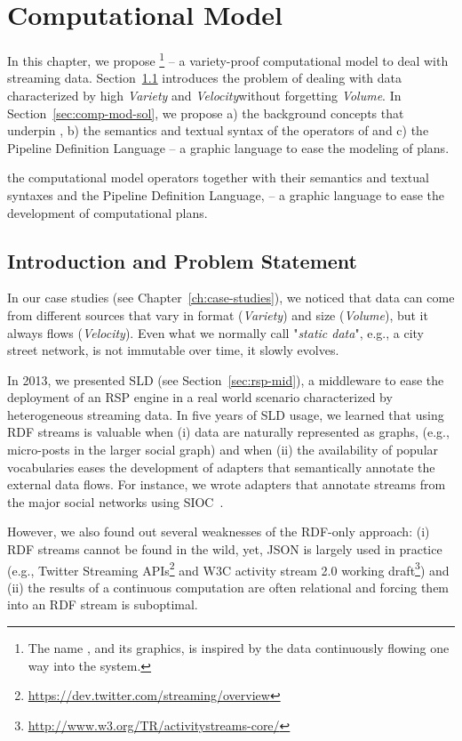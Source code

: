 \chapter{Computational Model}\label{ch:computational}
In this chapter, we propose \river{}\footnote{The name \river, and its graphics, is inspired by the data continuously flowing one way into the system.} -- a variety-proof computational model to deal with streaming data.
Section~\ref{sec:comp-mod-intro} introduces the problem of dealing with data characterized by high \textit{Variety} and \textit{Velocity}without forgetting \textit{Volume}.
In Section~\ref{sec:comp-mod-sol}, we propose a) the background concepts that underpin \river{}, b) the semantics and textual syntax of the operators of \river{} and c) the Pipeline Definition Language -- a graphic language to ease the modeling of \river{} plans.


the computational model operators together with their semantics and textual syntaxes and the Pipeline Definition Language, -- a graphic language to ease the development of computational plans.

\section{Introduction and Problem Statement} \label{sec:comp-mod-intro}
In our case studies (see Chapter~\ref{ch:case-studies}), we noticed that data can come from different sources that vary in format (\textit{Variety}) and size (\textit{Volume}), but it  always flows (\textit{Velocity}). Even what we normally call "\textit{static data}", e.g.,  a city street network, is not immutable over time, it  slowly evolves.

In 2013, we presented SLD (see Section~\ref{sec:rsp-mid}), a middleware to ease the deployment of an RSP engine in a real world scenario characterized by heterogeneous streaming data.
In five years of SLD usage, we learned that using RDF streams is valuable when (i) data are naturally represented as graphs, (e.g., micro-posts in the larger social graph) and when (ii) the availability of popular vocabularies eases the development of adapters that semantically annotate the external data flows.
For instance, we wrote adapters that annotate streams from the major social networks using SIOC~\cite{DBLP:journals/ijwbc/BreslinDHB06}.

However, we also found out several weaknesses of the RDF-only approach: (i) RDF streams cannot be found in the wild, yet, JSON is largely used in practice (e.g., Twitter Streaming APIs\footnote{\url{https://dev.twitter.com/streaming/overview}} and W3C activity stream 2.0 working draft\footnote{\url{http://www.w3.org/TR/activitystreams-core/}}) and (ii) the results of a continuous computation are often relational and forcing them into an RDF stream is suboptimal.

